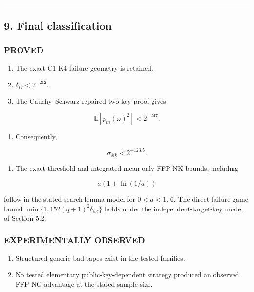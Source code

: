 \documentclass[11pt,a4paper]{article}
\providecommand{\tightlist}{\setlength{\itemsep}{0pt}\setlength{\parskip}{0pt}}
\begin{document}
\begin{center}\rule{0.5\linewidth}{0.5pt}\end{center}

\subsection{9. Final classification}\label{final-classification}

\subsubsection{PROVED}\label{proved}

\begin{enumerate}
\def\labelenumi{\arabic{enumi}.}
\tightlist
\item
  The exact C1-K4 failure geometry is retained.
\item
  \(\delta_{ik}<2^{-212}\).
\item
  The Cauchy--Schwarz-repaired two-key proof gives
\end{enumerate}

\[
\mathbb E[p_m(\omega)^2]<2^{-247}.
\]

\begin{enumerate}
\def\labelenumi{\arabic{enumi}.}
\setcounter{enumi}{3}
\tightlist
\item
  Consequently,
\end{enumerate}

\[
\sigma_{\delta ik}<2^{-123.5}.
\]

\begin{enumerate}
\def\labelenumi{\arabic{enumi}.}
\setcounter{enumi}{4}
\tightlist
\item
  The exact threshold and integrated mean-only FFP-NK bounds, including
\end{enumerate}

\[
a(1+\ln(1/a))
\]

follow in the stated search-lemma model for \(0<a<1\). 6. The direct failure-game bound \(\min\{1,152(q+1)^2\delta_{wc}\}\) holds under the independent-target-key model of Section 5.2.

\subsubsection{EXPERIMENTALLY OBSERVED}\label{experimentally-observed}

\begin{enumerate}
\def\labelenumi{\arabic{enumi}.}
\tightlist
\item
  Structured generic bad tapes exist in the tested families.
\item
  No tested elementary public-key-dependent strategy produced an observed FFP-NG advantage at the stated sample size.
\end{enumerate}
\end{document}
